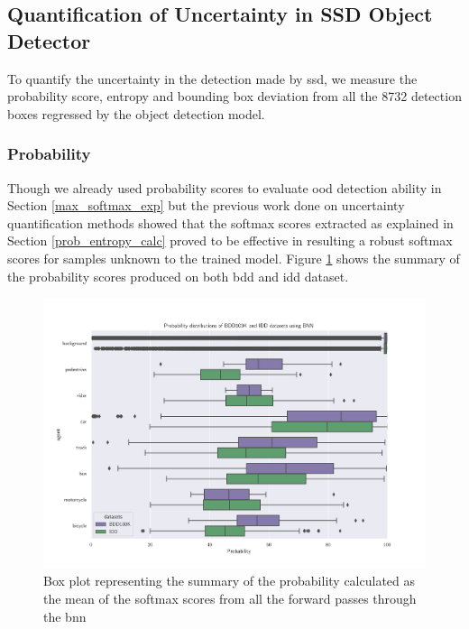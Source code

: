     \subsection{Quantification of Uncertainty in SSD Object Detector}
    \label{uq_methods}
    To quantify the uncertainty in the detection made by \acrshort{ssd}, we measure the probability score, entropy and bounding box deviation from all the 8732 detection boxes regressed by the object detection model.
    \subsubsection{Probability}
    Though we already used probability scores to evaluate \acrshort{ood} detection ability in Section \ref{max_softmax_exp} but the previous work done on uncertainty quantification methods \cite{Blundell2015, shridhar2019comprehensive, gal2016uncertainty} showed that the softmax scores extracted as explained in Section \ref{prob_entropy_calc} proved to be effective in resulting a robust softmax scores for samples unknown to the trained model. Figure \ref{fig:bnn_prob_summary} shows the summary of the probability scores produced on both \acrshort{bdd} and \acrshort{idd} dataset.
    \begin{figure}[H]
        \centering
        \includegraphics[scale=0.6]{images/distributions/BNN_bdd_vs_iid_probabilities.png}
        \caption[Box plot of probability with Bayesian model]{Box plot representing the summary of the probability calculated as the mean of the softmax scores from all the forward passes through the \acrshort{bnn}}
        \label{fig:bnn_prob_summary}
    \end{figure}
    
